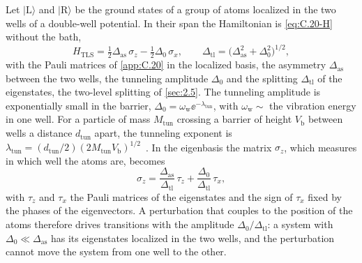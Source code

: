 Let $|\mathrm{L}\rangle$ and $|\mathrm{R}\rangle$ be the ground states of a group of atoms localized in the two wells of a double-well potential. In their span the Hamiltonian is \cref{eq:C.20-H} without the bath,
\begin{equation}
  H_{\mathrm{TLS}} = \tfrac12\Delta_{\mathrm{as}}\,\sigma_z - \tfrac12\Delta_0\,\sigma_x ,
  \qquad \Delta_{\mathrm{tl}} = \bigl(\Delta_{\mathrm{as}}^2 + \Delta_0^2\bigr)^{1/2} ,
  \label{eq:16.7-H}
\end{equation}
with the Pauli matrices of \cref{app:C.20} in the localized basis, the asymmetry $\Delta_{\mathrm{as}}$ between the two wells, the tunneling amplitude $\Delta_0$ and the splitting $\Delta_{\mathrm{tl}}$ of the eigenstates, the two-level splitting of \cref{sec:2.5}. The tunneling amplitude is exponentially small in the barrier, $\Delta_0 = \omega_{\mathrm{w}}\ee^{-\lambda_{\mathrm{tun}}}$, with $\omega_{\mathrm{w}} \sim$ the vibration energy in one well. For a particle of mass $M_{\mathrm{tun}}$ crossing a barrier of height $V_{\mathrm{b}}$ between wells a distance $d_{\mathrm{tun}}$ apart, the tunneling exponent is $\lambda_{\mathrm{tun}} = (d_{\mathrm{tun}}/2)(2M_{\mathrm{tun}}V_{\mathrm{b}})^{1/2}$~\cite[Sect.~II]{meissner2021acoustic}. In the eigenbasis the matrix $\sigma_z$, which measures in which well the atoms are, becomes
\begin{equation}
  \sigma_z = \frac{\Delta_{\mathrm{as}}}{\Delta_{\mathrm{tl}}}\,\tau_z + \frac{\Delta_0}{\Delta_{\mathrm{tl}}}\,\tau_x ,
  \label{eq:16.7-rot}
\end{equation}
with $\tau_z$ and $\tau_x$ the Pauli matrices of the eigenstates and the sign of $\tau_x$ fixed by the phases of the eigenvectors. A perturbation that couples to the position of the atoms therefore drives transitions with the amplitude $\Delta_0/\Delta_{\mathrm{tl}}$: a system with $\Delta_0 \ll \Delta_{\mathrm{as}}$ has its eigenstates localized in the two wells, and the perturbation cannot move the system from one well to the other.

